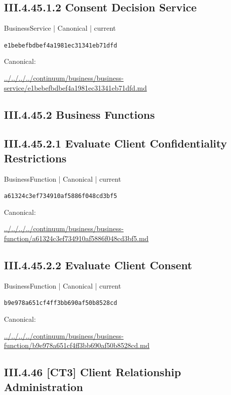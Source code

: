 \documentclass[10pt,a4paper]{article}
\begin{document}
\subsection*{III.4.45.1.2 Consent Decision Service}
{\small BusinessService | Canonical | current}\par
\texttt{e1bebefbdbef4a1981ec31341eb71dfd}\par
Canonical: \par
{\footnotesize\url{../../../../continuum/business/business-service/e1bebefbdbef4a1981ec31341eb71dfd.md}}\par
\subsection*{III.4.45.2 Business Functions}
\subsection*{III.4.45.2.1 Evaluate Client Confidentiality Restrictions}
{\small BusinessFunction | Canonical | current}\par
\texttt{a61324c3ef734910af5886f048cd3bf5}\par
Canonical: \par
{\footnotesize\url{../../../../continuum/business/business-function/a61324c3ef734910af5886f048cd3bf5.md}}\par
\subsection*{III.4.45.2.2 Evaluate Client Consent}
{\small BusinessFunction | Canonical | current}\par
\texttt{b9e978a651cf4ff3bb690af50b8528cd}\par
Canonical: \par
{\footnotesize\url{../../../../continuum/business/business-function/b9e978a651cf4ff3bb690af50b8528cd.md}}\par
\subsection*{III.4.46 [CT3] Client Relationship Administration}
\end{document}
